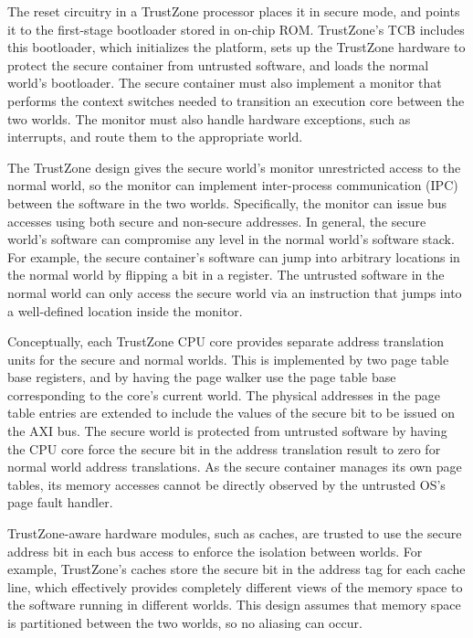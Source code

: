 The reset circuitry in a TrustZone processor places it in secure mode, and
points it to the first-stage bootloader stored in on-chip ROM. TrustZone's TCB
includes this bootloader, which initializes the platform, sets up the TrustZone
hardware to protect the secure container from untrusted software, and loads the
normal world's bootloader. The secure container must also implement a monitor
that performs the context switches needed to transition an execution core
between the two worlds. The monitor must also handle hardware exceptions, such
as interrupts, and route them to the appropriate world.

The TrustZone design gives the secure world's monitor unrestricted access to the
normal world, so the monitor can implement inter-process communication (IPC)
between the software in the two worlds. Specifically, the monitor can issue
bus accesses using both secure and non-secure addresses. In general, the secure
world's software can compromise any level in the normal world's software stack.
For example, the secure container's software can jump into arbitrary locations
in the normal world by flipping a bit in a register. The untrusted software in
the normal world can only access the secure world via an instruction that jumps
into a well-defined location inside the monitor.

Conceptually, each TrustZone CPU core provides separate address translation
units for the secure and normal worlds. This is implemented by two page table
base registers, and by having the page walker use the page table base
corresponding to the core's current world. The physical addresses in the page
table entries are extended to include the values of the secure bit to be issued
on the AXI bus. The secure world is protected from untrusted software by having
the CPU core force the secure bit in the address translation result to zero for
normal world address translations. As the secure container manages its own page
tables, its memory accesses cannot be directly observed by the untrusted OS's
page fault handler.

TrustZone-aware hardware modules, such as caches, are trusted to use the secure
address bit in each bus access to enforce the isolation between worlds. For
example, TrustZone's caches store the secure bit in the address tag for each
cache line, which effectively provides completely different views of the memory
space to the software running in different worlds. This design assumes that
memory space is partitioned between the two worlds, so no aliasing can occur.

